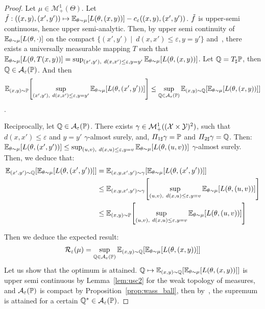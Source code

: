 \begin{proof}
Let $\mu\in\mathcal{M}^1_+(\Theta)$. Let $\Tilde{f}:((x,y),(x',y'))\mapsto \mathbb{E}_{\theta\sim\mu}\left[\loss(\theta,(x,y))\right]-c_\varepsilon((x,y),(x',y'))$. $\Tilde{f}$ is upper-semi continuous, hence upper semi-analytic. Then, by upper semi continuity of $\mathbb{E}_{\theta\sim\mu}\left[\loss(\theta,\cdot)\right]$ on the compact $\{(x',y')\mid~d(x,x')\leq\varepsilon,y=y'\}$ and~\citep[Proposition 7.50]{bertsekas2004stochastic}, there exists a universally measurable mapping $T$ such that $\mathbb{E}_{\theta\sim\mu}\left[\loss(\theta,T(x,y))\right]=\sup_{(x',y'),~d(x,x')\leq\varepsilon,y=y'}\mathbb{E}_{\theta\sim\mu}\left[\loss(\theta,(x,y))\right]$.  Let $\mathbb{Q} = T_{\sharp}\mathbb{P}$, then $\mathbb{Q}\in\mathcal{A}_\varepsilon(\mathbb{P})$. And then $$\mathbb{E}_{(x,y)\sim\PP}\left[\sup_{(x',y'),~d(x,x')\leq\varepsilon,y=y'}\mathbb{E}_{\theta\sim\mu}\left[\loss(\theta,(x',y'))\right]\right]\leq \sup_{\QQ\in\mathcal{A}_\varepsilon(\PP)}\mathbb{E}_{(x,y)\sim\QQ}\left[\mathbb{E}_{\theta\sim\mu}\left[\loss(\theta,(x,y))\right]\right]$$.

Reciprocally, let $\mathbb{Q}\in\mathcal{A}_\varepsilon(\mathbb{P})$. There exists $\gamma\in\mathcal{M}^1_+((\mathcal{X}\times\mathcal{Y})^2)$, such that $d(x,x')\leq\varepsilon$ and $y=y'$ $\gamma$-almost surely, and, $\Pi_{1\sharp}\gamma=\mathbb{P}$ and  $\Pi_{2\sharp}\gamma=\mathbb{Q}$. Then:
$\mathbb{E}_{\theta\sim\mu}\left[\loss(\theta,(x',y'))\right]\leq\sup_{(u,v),~d(x,u)\leq\varepsilon,y=v}\mathbb{E}_{\theta\sim\mu}\left[\loss(\theta,(u,v))\right]$ $\gamma$-almost surely. Then, we deduce that:
\begin{align*}
    \mathbb{E}_{(x',y')\sim\QQ}\left[\mathbb{E}_{\theta\sim\mu}\left[\loss(\theta,(x',y'))\right]\right]& =     \mathbb{E}_{(x,y,x',y')\sim\gamma}\left[\mathbb{E}_{\theta\sim\mu}\left[\loss(\theta,(x',y'))\right]\right] \\
    &\leq\mathbb{E}_{(x,y,x',y')\sim\gamma}\left[\sup_{(u,v),~d(x,u)\leq\varepsilon,y=v}\mathbb{E}_{\theta\sim\mu}\left[\loss(\theta,(u,v))\right]\right]\\
    &\leq\mathbb{E}_{(x,y)\sim\PP}\left[\sup_{(u,v),~d(x,u)\leq\varepsilon,y=v}\mathbb{E}_{\theta\sim\mu}\left[\loss(\theta,(u,v))\right]\right]
\end{align*}

Then we deduce the expected result:
\begin{align*}
\risk_\varepsilon(\mu)= \sup_{\QQ\in\mathcal{A}_\varepsilon(\PP)}\mathbb{E}_{(x,y)\sim\QQ}\left[\mathbb{E}_{\theta\sim\mu}\left[\loss(\theta,(x,y))\right]\right]
\end{align*}
Let us show that the optimum is attained. $\QQ\mapsto\mathbb{E}_{(x,y)\sim\QQ}\left[\mathbb{E}_{\theta\sim\mu}\left[\loss(\theta,(x,y))\right]\right]$ is upper semi continuous by Lemma~\ref{lem:usc2} for the weak topology of measures, and $\mathcal{A}_\varepsilon(\mathbb{P})$ is compact by Proposition~\ref{prop:wass_ball}, then by~\citep[Proposition 7.32]{bertsekas2004stochastic}, the supremum is attained for a certain $\mathbb{Q}^*\in\mathcal{A}_\varepsilon(\mathbb{P})$. 

\end{proof}

